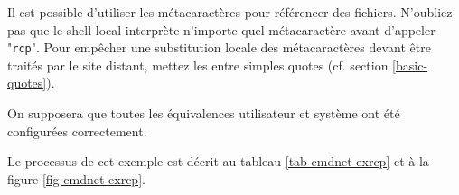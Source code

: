 Il est possible d'utiliser les m{\'e}tacaract{\`e}res pour r{\'e}f{\'e}rencer des
fichiers. N'oubliez pas que le shell local interpr{\`e}te n'importe quel
m{\'e}tacaract{\`e}re avant d'appeler "{\tt rcp}". Pour emp{\^e}cher une
substitution locale des m{\'e}tacaract{\`e}res devant {\^e}tre trait{\'e}s par le site
distant, mettez les entre simples quotes (cf. section \ref{basic-quotes}).

\begin{example}
\label{exp-cmdnet-exrcp}
On supposera que toutes les {\'e}quivalences utilisateur et syst{\`e}me ont {\'e}t{\'e}
configur{\'e}es correctement.

Le processus de cet exemple est d{\'e}crit au tableau \ref{tab-cmdnet-exrcp} et {\`a}
la figure \ref{fig-cmdnet-exrcp}.
\end{example}

